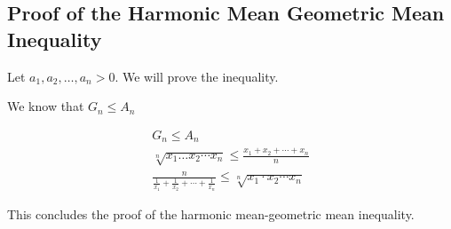 \subsection{Proof of the Harmonic Mean Geometric Mean Inequality}

Let \( a_1, a_2, \dots, a_n > 0 \). We will prove the inequality.

We know that \(G_n \leq A_n \)

\begin{align*}
		G_n \leq A_n\\
		\sqrt[n]{x_1 \dots x_2 \cdots x_n} \leq \frac{x_1 + x_2 + \cdots + x_n}{n}\\
		\frac{n}{\frac{1}{x_1} + \frac{1}{x_2} + \cdots + \frac{1}{x_n}} \leq \sqrt[n]{x_1 \cdot x_2 \cdots x_n}
\end{align*}

This concludes the proof of the harmonic mean-geometric mean inequality.

\QED